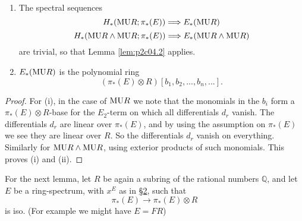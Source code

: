 \documentclass[../main]{subfiles}
\begin{document}
\begin{customlemma}{4.5}
\label{lem:p2c04.5}
\begin{enumerate}
    \item The spectral sequences
    \[H_\ast(\mathrm{MU}R;\pi_\ast(E))\Longrightarrow E_\ast(\mathrm{MU}R)\]
    \[H_\ast(\mathrm{MU}R\wedge \mathrm{MU}R; \pi_\ast(E))\Longrightarrow E_\ast(\mathrm{MU}R\wedge \mathrm{MU}R)\]
    are trivial, so that Lemma \ref{lem:p2c04.2} applies.
    \item $E_\ast(\mathrm{MU}R)$ is the polynomial ring 
    \[(\pi_\ast(E)\otimes R)[b_1,b_2,...,b_n,...].\]
\end{enumerate}
\end{customlemma}
\begin{proof}
For (i), in the case of $\mathrm{MU}R$ we note that the monomials in the $b_i$ form a $\pi_\ast(E)\otimes R$-base for the $E_2$-term on which all differentials $d_r$ vanish. The differentials $d_r$ are linear over $\pi_\ast(E)$, and by using the assumption on $\pi_\ast(E)$ we see they are linear over $R$. So the differentials $d_r$ vanish on everything. Similarly for $\mathrm{MU}R\wedge \mathrm{MU}R$, using exterior products of such monomials. This proves (i) and (ii).
\end{proof}

For the next lemma, let $R$ be again a subring of the rational numbers $\mathbb{Q}$, and let $E$ be a ring-spectrum, with $x^E$ as in \hyperref[sec:p2c2]{\S 2}, such that 
\[\pi_\ast(E)\longrightarrow\pi_\ast(E)\otimes R\]
is iso. (For example we might have $E=FR$)
\end{document}

